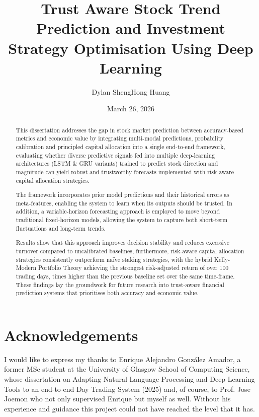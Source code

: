 \documentclass{l4proj}
\begin{document}
\title{Trust Aware Stock Trend Prediction and Investment Strategy Optimisation Using Deep Learning}
\author{Dylan ShengHong Huang}
\date{March 26, 2026}

\maketitle

\begin{abstract}
This dissertation addresses the gap in stock market prediction between accuracy-based metrics and economic value by integrating multi-modal predictions, probability calibration and principled capital allocation into a single end-to-end framework, evaluating whether diverse predictive signals fed into multiple deep-learning architectures (LSTM \& GRU variants) trained to predict stock direction and magnitude can yield robust and trustworthy forecasts implemented with risk-aware capital allocation strategies.

The framework incorporates prior model predictions and their historical errors as meta-features, enabling the system to learn when its outputs should be trusted. In addition, a variable-horizon forecasting approach is employed to move beyond traditional fixed-horizon models, allowing the system to capture both short-term fluctuations and long-term trends.

Results show that this approach improves decision stability and reduces excessive turnover compared to uncalibrated baselines, furthermore, risk-aware capital allocation strategies consistently outperform naïve staking strategies, with the hybrid Kelly-Modern Portfolio Theory achieving the strongest risk-adjusted return of  over 100 trading days,  times higher than the previous baseline set over the same time-frame. These findings lay the groundwork for future research into trust-aware financial prediction systems that prioritises both accuracy and economic value.
\end{abstract}

\chapter*{Acknowledgements}
I would like to express my thanks to Enrique Alejandro González Amador, a former MSc student at the University of Glasgow School of Computing Science, whose dissertation on Adapting Natural Language Processing and Deep Learning Tools to an end-to-end Day Trading System (2025) and, of course, to Prof. Jose Joemon who not only supervised Enrique but myself as well. Without his experience and guidance this project could not have reached the level that it has.
\end{document}
